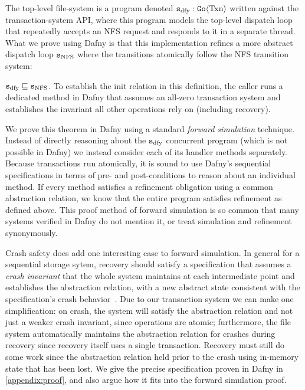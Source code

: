 The top-level file-system is a program denoted $\texttt{s}_{\mathrm{dfy}} : \mathtt{Go}\langle \mathrm{Txn} \rangle$
written against the transaction-system API, where this program models the
top-level dispatch loop that repeatedly accepts an NFS request and responds to
it in a separate thread. What we prove using Dafny is that this implementation
refines a more abstract dispatch loop $\texttt{s}_{\mathrm{NFS}}$ where the transitions atomically
follow the NFS transition system:

\begin{theorem}
  $\texttt{s}_{\mathrm{dfy}} \sqsubseteq \texttt{s}_{\mathrm{NFS}}$. To establish the init relation in this definition,
  the caller runs a dedicated method in Dafny that assumes an all-zero
  transaction system and establishes the invariant all other operations rely on
  (including recovery).
  \label{thm:dafny}
\end{theorem}

We prove this theorem in Dafny using a standard \emph{forward simulation}
technique.  Instead of directly reasoning about the $\texttt{s}_{\mathrm{dfy}}$ concurrent program
(which is not possible in Dafny) we instead consider each of its handler methods
separately. Because transactions run atomically, it is sound to use Dafny's
sequential specifications in terms of pre- and post-conditions to reason about
an individual method. If every method satisfies a refinement obligation using a
common abstraction relation, we know that the entire program satisfies
refinement as defined above. This proof method of forward simulation is
so common that many systems verified in Dafny do not mention it, or treat
simulation and refinement synonymously.

Crash safety does add one interesting case to forward simulation. In general for
a sequential storage sytem, recovery should satisfy a specification that assumes
a \emph{crash invariant} that the whole system maintains at each intermediate
point and establishes the abstraction relation, with a new abstract state
consistent with the specification's crash behavior~\cite{chajed:argosy}. Due to
our transaction system we can make one simplification: on crash, the system will
satisfy the abstraction relation and not just a weaker crash invariant, since
operations are atomic; furthermore, the file system automatically maintains the
abstraction relation for crashes during recovery since recovery itself uses a
single transaction. Recovery must still do some work since the abstraction
relation held prior to the crash using in-memory state that has been lost. We
give the precise specification proven in Dafny in \autoref{appendix:proof}, and
also argue how it fits into the forward simulation proof.

